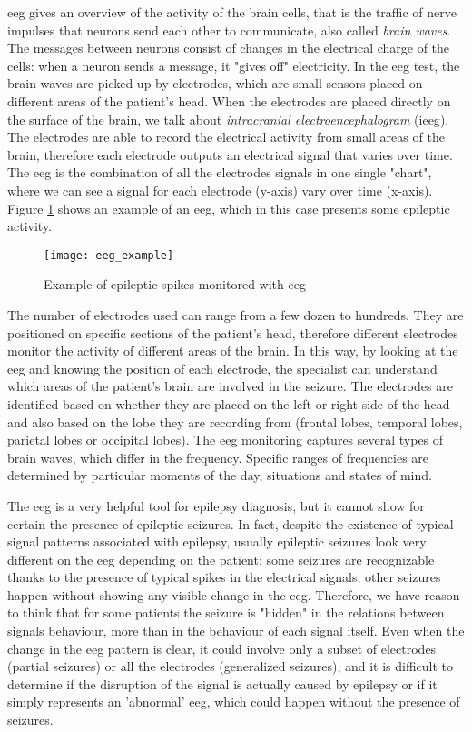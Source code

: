 \acs{eeg} gives an overview of the activity of the brain cells, that is the traffic of nerve impulses that neurons send each other to communicate, also called \textit{brain waves}. The messages between neurons consist of changes in the electrical charge of the cells: when a neuron sends a message, it "gives off" electricity. In the \acs{eeg} test, the brain waves are picked up by electrodes, which are small sensors placed on different areas of the patient's head. When the electrodes are placed directly on the surface of the brain, we talk about \textit{intracranial electroencephalogram} (\acs{ieeg}). The electrodes are able to record the electrical activity from small areas of the brain, therefore each electrode outputs an electrical signal that varies over time. The \acs{eeg} is the combination of all the electrodes signals in one single "chart", where we can see a signal for each electrode (y-axis) vary over time (x-axis). Figure \ref{fig:eeg_example} shows an example of an \acs{eeg}, which in this case presents some epileptic activity.

\begin{figure}[htbp]
    \centering
    \texttt{[image: eeg\_example]}
    \caption{Example of epileptic spikes monitored with \acs{eeg}}
    \label{fig:eeg_example}
\end{figure}

The number of electrodes used can range from a few dozen to hundreds. They are positioned on specific sections of the patient's head, therefore different electrodes monitor the activity of different areas of the brain. In this way, by looking at the \acs{eeg} and knowing the position of each electrode, the specialist can understand which areas of the patient's brain are involved in the seizure. The electrodes are identified based on whether they are placed on the left or right side of the head and also based on the lobe they are recording from (frontal lobes, temporal lobes, parietal lobes or occipital lobes). The \acs{eeg} monitoring captures several types of brain waves, which differ in the frequency. Specific ranges of frequencies are determined by particular moments of the day, situations and states of mind.

The \acs{eeg} is a very helpful tool for epilepsy diagnosis, but it cannot show for certain the presence of epileptic seizures. In fact, despite the existence of typical signal patterns associated with epilepsy, usually epileptic seizures look very different on the \acs{eeg} depending on the patient: some seizures are recognizable thanks to the presence of typical spikes in the electrical signals; other seizures happen without showing any visible change in the \acs{eeg}. Therefore, we have reason to think that for some patients the seizure is "hidden" in the relations between signals behaviour, more than in the behaviour of each signal itself. Even when the change in the \acs{eeg} pattern is clear, it could involve only a subset of electrodes (partial seizures) or all the electrodes (generalized seizures), and it is difficult to determine if the disruption of the signal is actually caused by epilepsy or if it simply represents an 'abnormal' \acs{eeg}, which could happen without the presence of seizures.


